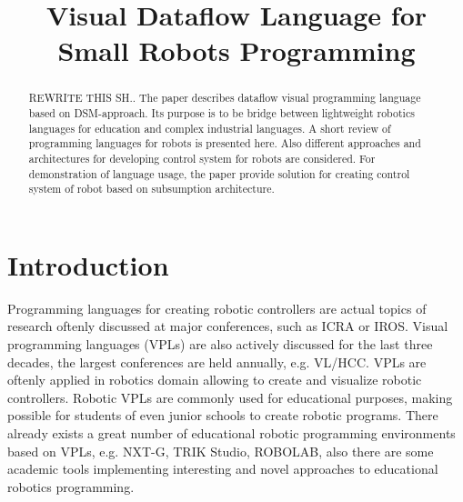 \documentclass[conference,compsoc]{IEEEtran}
\begin{document}
\title{Visual Dataflow Language for Small Robots Programming}

\author{
	
	\and

}

\maketitle



\begin{abstract}
REWRITE THIS SH..
The paper describes dataflow visual programming language based on DSM-approach. Its purpose is to be bridge between lightweight robotics languages for education and complex industrial languages. A short review of programming languages for robots is presented here. Also different approaches and architectures for developing control system for robots are considered. For demonstration of language usage, the paper provide solution for creating control system of robot based on subsumption architecture. 
\end{abstract}

\section{Introduction}

Programming languages for creating robotic controllers are actual topics of research oftenly discussed at major conferences, such as ICRA\cite{Icra} or IROS\cite{Iros2016}. Visual programming languages (VPLs) are also actively discussed for the last three decades, the largest conferences are held annually, e.g. VL/HCC\cite{VLHCC}. VPLs are oftenly applied in robotics domain\cite{banyasad2000visual,simpson2006mobile,simpson2008visual,posso2011process,diprose2011ruru} allowing to create and visualize robotic controllers. Robotic VPLs are commonly used for educational purposes, making possible for students of even junior schools to create robotic programs. There already exists a great number of educational robotic programming environments based on VPLs, e.g. NXT-G\cite{nxtg}, TRIK Studio\cite{trik}, ROBOLAB\cite{robolab}, also there are some academic tools implementing interesting and novel approaches to educational robotics programming\cite{banyasad2000visual,simpson2008visual,diprose2011ruru}.
\end{document}
